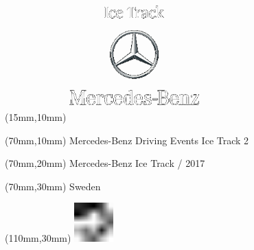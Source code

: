 \null\newpage
\begin{textblock*}{50mm}(15mm,10mm)%
\includegraphics[width=50mm]{LG/MER.png}
\end{textblock*}
\begin{textblock*}{130mm}(70mm,10mm)%
{\fontsize{20}{20}\selectfont Mercedes-Benz Driving Events Ice Track 2}\\
\end{textblock*}
\begin{textblock*}{120mm}(70mm,20mm)%
{\fontsize{16}{16}\selectfont Mercedes-Benz Ice Track / 2017}\\
\end{textblock*}
\begin{textblock*}{120mm}(70mm,30mm)%
{\fontsize{12}{12}\selectfont Sweden}
\end{textblock*}
\begin{textblock*}{30mm}(110mm,30mm)%
\centering
\includegraphics[height=15mm]{icons/fa-rotate-left.pdf}
\end{textblock*}
